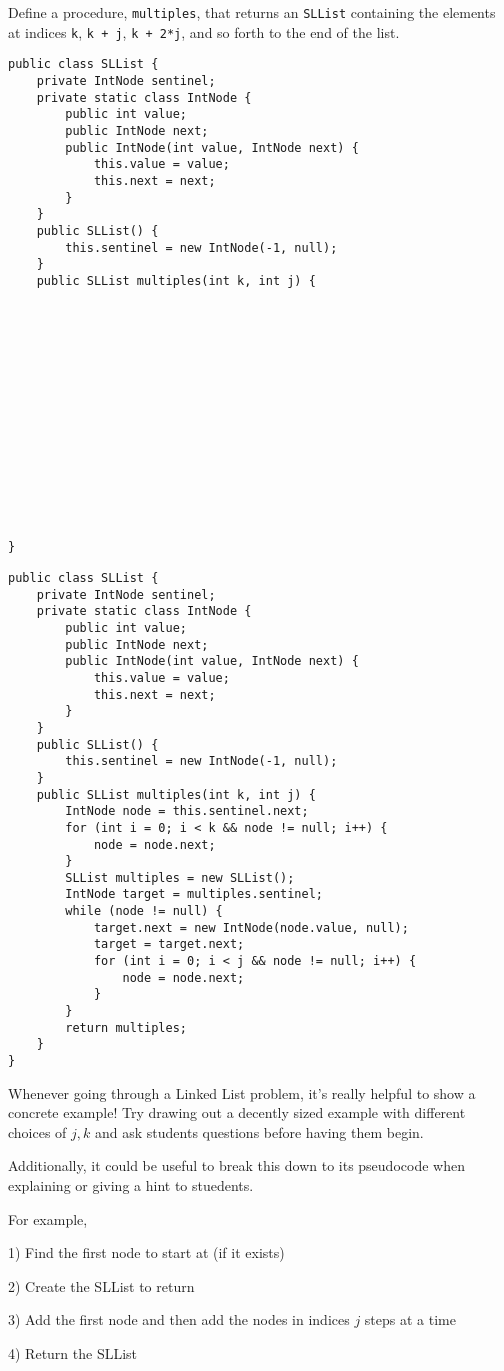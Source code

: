 \question Define a procedure, \texttt{multiples}, that returns an \texttt{SLList} containing the elements at indices \texttt{k}, \texttt{k + j}, \texttt{k + 2*j}, and so forth to the end of the list.

\ifprintanswers\else
\begin{lstlisting}
public class SLList {
    private IntNode sentinel;
    private static class IntNode {
        public int value;
        public IntNode next;
        public IntNode(int value, IntNode next) {
            this.value = value;
            this.next = next;
        }
    }
    public SLList() {
        this.sentinel = new IntNode(-1, null);
    }
    public SLList multiples(int k, int j) {















}

\end{lstlisting}
\fi

\begin{solution}
\begin{lstlisting}
public class SLList {
    private IntNode sentinel;
    private static class IntNode {
        public int value;
        public IntNode next;
        public IntNode(int value, IntNode next) {
            this.value = value;
            this.next = next;
        }
    }
    public SLList() {
        this.sentinel = new IntNode(-1, null);
    }
    public SLList multiples(int k, int j) {
        IntNode node = this.sentinel.next;
        for (int i = 0; i < k && node != null; i++) {
            node = node.next;
        }
        SLList multiples = new SLList();
        IntNode target = multiples.sentinel;
        while (node != null) {
            target.next = new IntNode(node.value, null);
            target = target.next;
            for (int i = 0; i < j && node != null; i++) {
                node = node.next;
            }
        }
        return multiples;
    }
}
\end{lstlisting}

\newpage
\begin{meta}
Whenever going through a Linked List problem, it's really helpful to show a concrete example! Try drawing out a decently sized example with different choices of $j,k$ and ask students questions before having them begin. 

Additionally, it could be useful to break this down to its pseudocode when explaining or giving a hint to stuedents. 

For example, 

1) Find the first node to start at (if it exists)

2) Create the SLList to return 

3) Add the first node and then add the nodes in indices $j$ steps at a time

4) Return the SLList
\end{meta}

\end{solution}

